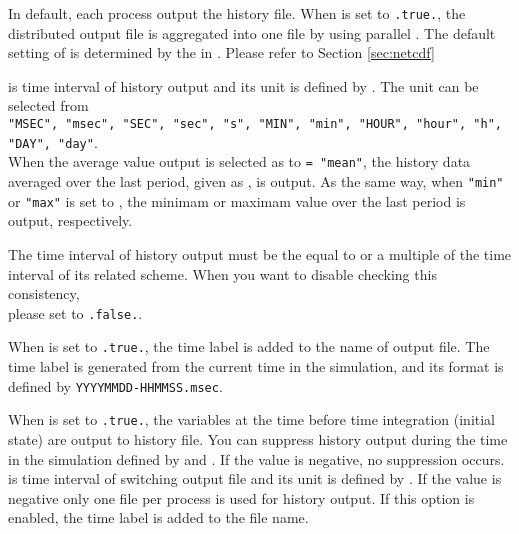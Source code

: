 In default, each process output the history file.
When  is set to \verb|.true.|, the distributed output file is aggregated into one file by using parallel \Netcdf.
The default setting of  is determined by the  in .
Please refer to Section \ref{sec:netcdf}

 is time interval of history output and its unit is defined by .
The unit can be selected from\\
\verb|"MSEC", "msec", "SEC", "sec", "s", "MIN", "min", "HOUR", "hour", "h", "DAY", "day"|.\\
%
When the average value output is selected as  to \verb|= "mean"|,
the history data averaged over the last period, given as , is output.
As the same way, when \verb|"min"| or \verb|"max"| is set to , the minimam or maximam value over the last period is output, respectively.

The time interval of history output must be the equal to or a multiple of the time interval of its related scheme.
When you want to disable checking this consistency,\\
please set  to \verb|.false.|.

When  is set to \verb|.true.|, the time label is added to the name of output file.
The time label is generated from the current time in the simulation, and its format is defined by \verb|YYYYMMDD-HHMMSS.msec|.

When  is set to \verb|.true.|, the variables at the time before time integration (initial state) are output to history file.
You can suppress history output during the time in the simulation defined by  and .
If the value is negative, no suppression occurs.
 is time interval of switching output file and its unit is defined by .
If the value is negative only one file per process is used for history output. If this option is enabled, the time label is added to the file name.

